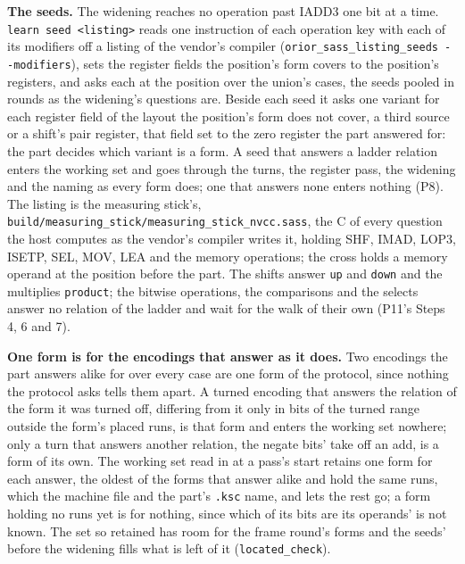 \textbf{The seeds.} The widening reaches no operation past IADD3 one bit at a time. \texttt{learn seed <listing>} reads one instruction of each operation key with each of its modifiers off a listing of the vendor's compiler (\texttt{orior\_\allowbreak{}sass\_\allowbreak{}listing\_\allowbreak{}seeds -\allowbreak{}-\allowbreak{}modifiers}), sets the register fields the position's form covers to the position's registers, and asks each at the position over the union's cases, the seeds pooled in rounds as the widening's questions are. Beside each seed it asks one variant for each register field of the layout the position's form does not cover, a third source or a shift's pair register, that field set to the zero register the part answered for: the part decides which variant is a form. A seed that answers a ladder relation enters the working set and goes through the turns, the register pass, the widening and the naming as every form does; one that answers none enters nothing (P8). The listing is the measuring stick's, \texttt{build/\allowbreak{}measuring\_\allowbreak{}stick/\allowbreak{}measuring\_\allowbreak{}stick\_\allowbreak{}nvcc.\allowbreak{}sass}, the C of every question the host computes as the vendor's compiler writes it, holding SHF, IMAD, LOP3, ISETP, SEL, MOV, LEA and the memory operations; the cross holds a memory operand at the position before the part. The shifts answer \texttt{up} and \texttt{down} and the multiplies \texttt{product}; the bitwise operations, the comparisons and the selects answer no relation of the ladder and wait for the walk of their own (P11's Steps 4, 6 and 7).

\textbf{One form is for the encodings that answer as it does.} Two encodings the part answers alike for over every case are one form of the protocol, since nothing the protocol asks tells them apart. A turned encoding that answers the relation of the form it was turned off, differing from it only in bits of the turned range outside the form's placed runs, is that form and enters the working set nowhere; only a turn that answers another relation, the negate bits' take off an add, is a form of its own. The working set read in at a pass's start retains one form for each answer, the oldest of the forms that answer alike and hold the same runs, which the machine file and the part's \texttt{.\allowbreak{}ksc} name, and lets the rest go; a form holding no runs yet is for nothing, since which of its bits are its operands' is not known. The set so retained has room for the frame round's forms and the seeds' before the widening fills what is left of it (\texttt{located\_\allowbreak{}check}).

